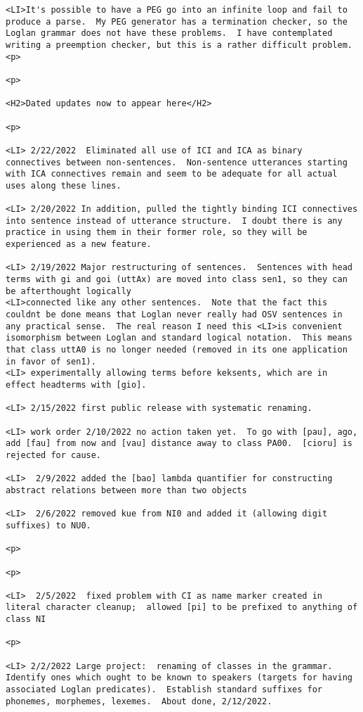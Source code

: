\documentclass[12pt]{article}
\begin{document}
\begin{lstlisting}
<LI>It's possible to have a PEG go into an infinite loop and fail to produce a parse.  My PEG generator has a termination checker, so the Loglan grammar does not have these problems.  I have contemplated writing a preemption checker, but this is a rather difficult problem.<p>

<p>

<H2>Dated updates now to appear here</H2>

<p>

<LI> 2/22/2022  Eliminated all use of ICI and ICA as binary connectives between non-sentences.  Non-sentence utterances starting with ICA connectives remain and seem to be adequate for all actual uses along these lines.

<LI> 2/20/2022 In addition, pulled the tightly binding ICI connectives into sentence instead of utterance structure.  I doubt there is any practice in using them in their former role, so they will be experienced as a new feature.

<LI> 2/19/2022 Major restructuring of sentences.  Sentences with head terms with gi and goi (uttAx) are moved into class sen1, so they can be afterthought logically
<LI>connected like any other sentences.  Note that the fact this couldnt be done means that Loglan never really had OSV sentences in any practical sense.  The real reason I need this <LI>is convenient isomorphism between Loglan and standard logical notation.  This means that class uttA0 is no longer needed (removed in its one application in favor of sen1).
<LI> experimentally allowing terms before keksents, which are in effect headterms with [gio].

<LI> 2/15/2022 first public release with systematic renaming.

<LI> work order 2/10/2022 no action taken yet.  To go with [pau], ago, add [fau] from now and [vau] distance away to class PA00.  [cioru] is rejected for cause.

<LI>  2/9/2022 added the [bao] lambda quantifier for constructing abstract relations between more than two objects

<LI>  2/6/2022 removed kue from NI0 and added it (allowing digit suffixes) to NU0.

<p>

<p>

<LI>  2/5/2022  fixed problem with CI as name marker created in literal character cleanup;  allowed [pi] to be prefixed to anything of class NI

<p>

<LI> 2/2/2022 Large project:  renaming of classes in the grammar.  Identify ones which ought to be known to speakers (targets for having associated Loglan predicates).  Establish standard suffixes for phonemes, morphemes, lexemes.  About done, 2/12/2022.


\end{lstlisting}
\end{document}
